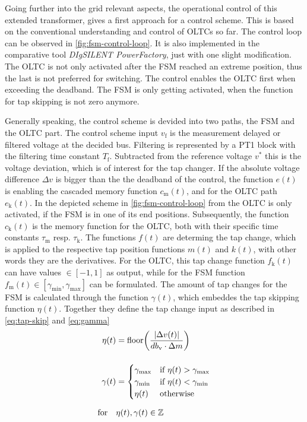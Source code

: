 Going further into the grid relevant aspects, the operational control of this extended transformer, \textcite{burlakin_2024} gives a first approach for a control scheme.
This is based on the conventional understanding and control of \acsp{OLTC} so far.
The control loop can be observed in \autoref{fig:fsm-control-loop}.
It is also implemented in the comparative tool \textit{DIgSILENT PowerFactory}, just with one slight modification.
The \acs{OLTC} is not only activated after the \acs{FSM} reached an extreme position, thus the last is not preferred for switching.
The control enables the \acs{OLTC} first when exceeding the deadband.
The \acs{FSM} is only getting activated, when the function for tap skipping is not zero anymore.

Generally speaking, the control scheme is devided into two paths, the \acs{FSM} and the \acs{OLTC} part.
The control scheme input $v_\mathrm{f}$ is the measurement delayed or filtered voltage at the decided bus.
Filtering is represented by a PT1 block with the filtering time constant $T_\mathrm{f}$.
Subtracted from the reference voltage $v^*$ this is the voltage deviation, which is of interest for the tap changer. 
If the absolute voltage difference $\Delta v$ is bigger than the the deadband of the control, the function $e(t)$ is enabling the cascaded memory function $c_\mathrm{m}(t)$, and for the \acs{OLTC} path $e_\mathrm{k}(t)$.
In the depicted scheme in \autoref{fig:fsm-control-loop} from \autocite{burlakin_2024} the \acs{OLTC} is only activated, if the \acs{FSM} is in one of its end positions.
Subsequently, the function $c_\mathrm{k}(t)$ is the memory function for the \acs{OLTC}, both with their specific time constants $\tau_\mathrm{m}$ resp. $\tau_\mathrm{k}$.
The functions $f(t)$ are determing the tap change, which is applied to the respective tap position functions $m(t)$ and $k(t)$, with other words they are the derivatives.
For the \acs{OLTC}, this tap change function $f_\mathrm{k}(t)$ can have values $\in [-1,1]$ as output, while for the \acs{FSM} function $f_\mathrm{m}(t) \in [\gamma_\mathrm{min},\gamma_\mathrm{max}]$ can be formulated.
The amount of tap changes for the \acs{FSM} is calculated through the function $\gamma(t)$, which embeddes the tap skipping function $\eta(t)$.
Together they define the tap change input as described in \autoref{eq:tap-skip} and \autoref{eq:gamma}
\begin{align}
    \eta(t) &= \text{floor}\bigg( \frac{\vert \Delta v(t) \vert}{db_\mathrm{v} \cdot \Delta m} \bigg) \label{eq:tap-skip}\\[12pt]
    \gamma(t) &= \begin{cases}
        \gamma_\mathrm{max} & \text{if } \eta(t) > \gamma_\mathrm{max} \\
        \gamma_\mathrm{min} & \text{if } \eta(t) < \gamma_\mathrm{min} \\
        \eta(t) & \text{otherwise}
    \end{cases} \label{eq:gamma} \\[6pt]
    \text{for}\quad&\eta(t),\gamma(t) \in \mathbb{Z} \notag
\end{align}
